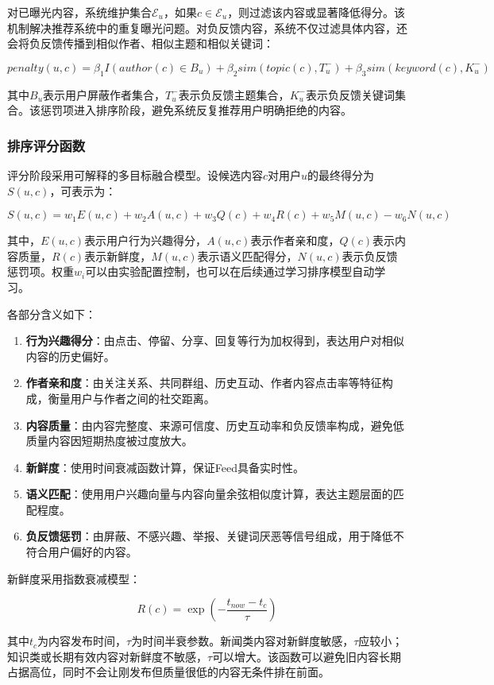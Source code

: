 对已曝光内容，系统维护集合$\mathcal{E}_u$，如果$c \in \mathcal{E}_u$，则过滤该内容或显著降低得分。该机制解决推荐系统中的重复曝光问题。对负反馈内容，系统不仅过滤具体内容，还会将负反馈传播到相似作者、相似主题和相似关键词：

\[
  penalty(u,c)=\beta_1 I(author(c)\in B_u)+\beta_2 sim(topic(c),T_u^{-})+\beta_3 sim(keyword(c),K_u^{-})
\]

其中$B_u$表示用户屏蔽作者集合，$T_u^{-}$表示负反馈主题集合，$K_u^{-}$表示负反馈关键词集合。该惩罚项进入排序阶段，避免系统反复推荐用户明确拒绝的内容。

\subsubsection{排序评分函数}

评分阶段采用可解释的多目标融合模型。设候选内容$c$对用户$u$的最终得分为$S(u,c)$，可表示为：

\[
  S(u,c)=w_1E(u,c)+w_2A(u,c)+w_3Q(c)+w_4R(c)+w_5M(u,c)-w_6N(u,c)
\]

其中，$E(u,c)$表示用户行为兴趣得分，$A(u,c)$表示作者亲和度，$Q(c)$表示内容质量，$R(c)$表示新鲜度，$M(u,c)$表示语义匹配得分，$N(u,c)$表示负反馈惩罚项。权重$w_i$可以由实验配置控制，也可以在后续通过学习排序模型自动学习。

各部分含义如下：

\begin{enumerate}
  \item \textbf{行为兴趣得分}：由点击、停留、分享、回复等行为加权得到，表达用户对相似内容的历史偏好。
  \item \textbf{作者亲和度}：由关注关系、共同群组、历史互动、作者内容点击率等特征构成，衡量用户与作者之间的社交距离。
  \item \textbf{内容质量}：由内容完整度、来源可信度、历史互动率和负反馈率构成，避免低质量内容因短期热度被过度放大。
  \item \textbf{新鲜度}：使用时间衰减函数计算，保证Feed具备实时性。
  \item \textbf{语义匹配}：使用用户兴趣向量与内容向量余弦相似度计算，表达主题层面的匹配程度。
  \item \textbf{负反馈惩罚}：由屏蔽、不感兴趣、举报、关键词厌恶等信号组成，用于降低不符合用户偏好的内容。
\end{enumerate}

新鲜度采用指数衰减模型：

\[
  R(c)=\exp\left(-\frac{t_{now}-t_c}{\tau}\right)
\]

其中$t_c$为内容发布时间，$\tau$为时间半衰参数。新闻类内容对新鲜度敏感，$\tau$应较小；知识类或长期有效内容对新鲜度不敏感，$\tau$可以增大。该函数可以避免旧内容长期占据高位，同时不会让刚发布但质量很低的内容无条件排在前面。

